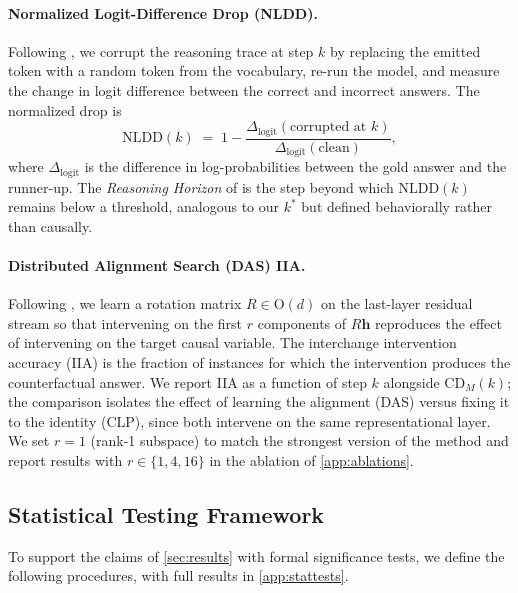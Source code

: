 \documentclass[11pt]{article}
\newcommand{\CDM}{\mathrm{CD}_{M}}
\newcommand{\stepk}{k}
\newcommand{\CLP}{\textsc{CLP}}
\begin{document}
\paragraph{Normalized Logit-Difference Drop (NLDD).}
Following \citet{DBLP:journals/corr/abs-2602-11201}, we corrupt the reasoning
trace at step $\stepk$ by replacing the emitted token with a random token from
the vocabulary, re-run the model, and measure the change in logit difference
between the correct and incorrect answers. The normalized drop is
\begin{equation}
\label{eq:nldd}
\mathrm{NLDD}(\stepk) \;=\;
1 - \frac{\Delta_{\mathrm{logit}}(\text{corrupted at }\stepk)}
         {\Delta_{\mathrm{logit}}(\text{clean})},
\end{equation}
where $\Delta_{\mathrm{logit}}$ is the difference in log-probabilities between
the gold answer and the runner-up. The \emph{Reasoning Horizon} of
\citet{DBLP:journals/corr/abs-2602-11201} is the step beyond which
$\mathrm{NLDD}(\stepk)$ remains below a threshold, analogous to our
$\stepk^{*}$ but defined behaviorally rather than causally.

\paragraph{Distributed Alignment Search (DAS) IIA.}
Following \citet{DBLP:conf/clear2/GeigerWPIG24}, we learn a rotation matrix
$R\in\mathrm{O}(d)$ on the last-layer residual stream so that intervening on the
first $r$ components of $R\mathbf{h}$ reproduces the effect of intervening on
the target causal variable. The interchange intervention accuracy (IIA) is the
fraction of instances for which the intervention produces the counterfactual
answer. We report IIA as a function of step $\stepk$ alongside $\CDM(\stepk)$;
the comparison isolates the effect of learning the alignment (DAS) versus fixing
it to the identity (\CLP), since both intervene on the same representational
layer. We set $r=1$ (rank-1 subspace) to match the strongest version of the
method and report results with $r\in\{1,4,16\}$ in the ablation of
\cref{app:ablations}.

\subsection{Statistical Testing Framework}
\label{app:metrics-stats}

To support the claims of \cref{sec:results} with formal significance tests, we
define the following procedures, with full results in \cref{app:stattests}.
\end{document}

